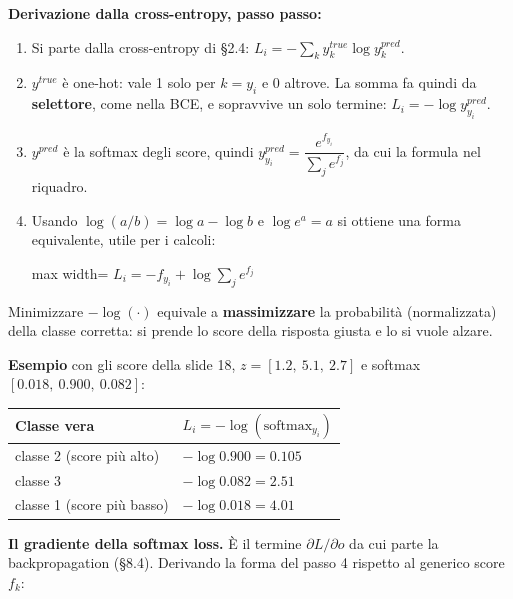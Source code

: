 \documentclass[11pt,a4paper,oneside,openany]{book}
\providecommand{\tightlist}{\setlength{\itemsep}{0pt}\setlength{\parskip}{0pt}}
\begin{document}
\textbf{Derivazione dalla cross-entropy, passo passo:}

\begin{enumerate}
\def\labelenumi{\arabic{enumi}.}
\tightlist
\item
  Si parte dalla cross-entropy di §2.4: \(L_i = -\sum_k y^{true}_k \log y^{pred}_k\).
\item
  \(y^{true}\) è one-hot: vale 1 solo per \(k = y_i\) e 0 altrove. La somma fa quindi da \textbf{selettore}, come nella BCE, e sopravvive un solo termine: \(L_i = -\log y^{pred}_{y_i}\).
\item
  \(y^{pred}\) è la softmax degli score, quindi \(y^{pred}_{y_i} = \dfrac{e^{f_{y_i}}}{\sum_j e^{f_j}}\), da cui la formula nel riquadro.
\item
  Usando \(\log(a/b) = \log a - \log b\) e \(\log e^{a} = a\) si ottiene una forma equivalente, utile per i calcoli: \begin{center}
\begin{adjustbox}{max width=\linewidth}
$\displaystyle L_i = -f_{y_i} + \log\sum_j e^{f_j}$
\end{adjustbox}
\end{center}
\end{enumerate}

Minimizzare \(-\log(\cdot)\) equivale a \textbf{massimizzare} la probabilità (normalizzata) della classe corretta: si prende lo score della risposta giusta e lo si vuole alzare.

\textbf{Esempio} con gli score della slide 18, \(z = [1.2,\ 5.1,\ 2.7]\) e softmax \([0.018,\ 0.900,\ 0.082]\):

\begin{longtable}[]{@{}ll@{}}
\toprule\noalign{}
Classe vera & \(L_i = -\log(\text{softmax}_{y_i})\) \\
\midrule\noalign{}
\endhead
\bottomrule\noalign{}
\endlastfoot
classe 2 (score più alto) & \(-\log 0.900 = 0.105\) \\
classe 3 & \(-\log 0.082 = 2.51\) \\
classe 1 (score più basso) & \(-\log 0.018 = 4.01\) \\
\end{longtable}

\textbf{Il gradiente della softmax loss.} È il termine \(\partial L/\partial o\) da cui parte la backpropagation (§8.4). Derivando la forma del passo 4 rispetto al generico score \(f_k\):
\end{document}
